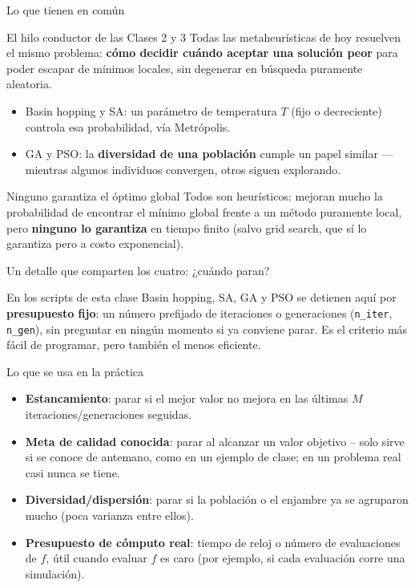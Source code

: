 \documentclass[aspectratio=169,10pt]{beamer}
\begin{document}
\begin{frame}{Lo que tienen en común}
  \begin{block}{El hilo conductor de las Clases 2 y 3}
    Todas las metaheurísticas de hoy resuelven el mismo problema:
    \textbf{cómo decidir cuándo aceptar una solución peor} para poder
    escapar de mínimos locales, sin degenerar en búsqueda puramente
    aleatoria.
    \begin{itemize}
      \item Basin hopping y SA: un parámetro de temperatura $T$
        (fijo o decreciente) controla esa probabilidad, vía Metrópolis.
      \item GA y PSO: la \textbf{diversidad de una población} cumple un
        papel similar — mientras algunos individuos convergen, otros
        siguen explorando.
    \end{itemize}
  \end{block}
  \begin{exampleblock}{Ninguno garantiza el óptimo global}
    Todos son heurísticos: mejoran mucho la probabilidad de encontrar el
    mínimo global frente a un método puramente local, pero
    \textbf{ninguno lo garantiza} en tiempo finito (salvo grid search,
    que sí lo garantiza pero a costo exponencial).
  \end{exampleblock}
\end{frame}

\begin{frame}{Un detalle que comparten los cuatro: ¿cuándo paran?}
  \begin{alertblock}{En los scripts de esta clase}
    Basin hopping, SA, GA y PSO se detienen aquí por
    \textbf{presupuesto fijo}: un número prefijado de iteraciones o
    generaciones (\texttt{n\_iter}, \texttt{n\_gen}), sin preguntar en
    ningún momento si ya conviene parar. Es el criterio más fácil de
    programar, pero también el menos eficiente.
  \end{alertblock}
  \begin{block}{Lo que se usa en la práctica}
    \begin{itemize}
      \item \textbf{Estancamiento}: parar si el mejor valor no mejora
        en las últimas $M$ iteraciones/generaciones seguidas.
      \item \textbf{Meta de calidad conocida}: parar al alcanzar un
        valor objetivo -- solo sirve si se conoce de antemano, como en
        un ejemplo de clase; en un problema real casi nunca se tiene.
      \item \textbf{Diversidad/dispersión}: parar si la población o el
        enjambre ya se agruparon mucho (poca varianza entre ellos).
      \item \textbf{Presupuesto de cómputo real}: tiempo de reloj o
        número de evaluaciones de $f$, útil cuando evaluar $f$ es caro
        (por ejemplo, si cada evaluación corre una simulación).
    \end{itemize}
  \end{block}
\end{frame}
\end{document}
